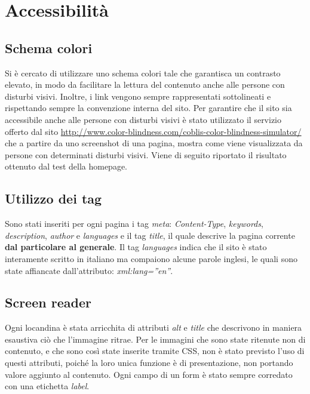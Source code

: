 \section{Accessibilità}
	\subsection{Schema colori}
	Si è cercato di utilizzare uno schema colori tale che garantisca un contrasto elevato, in modo da facilitare la lettura del contenuto anche alle persone con disturbi visivi. Inoltre, i link vengono sempre rappresentati sottolineati e rispettando sempre la convenzione interna del sito. Per garantire che il sito sia accessibile anche alle persone con disturbi visivi è stato utilizzato il servizio offerto dal sito \url{http://www.color-blindness.com/coblis-color-blindness-simulator/} che a partire da uno screenshot di una pagina, mostra come viene visualizzata da persone con determinati disturbi visivi. Viene di seguito riportato il risultato ottenuto dal test della homepage.

	\subsection{Utilizzo dei tag}
	Sono stati inseriti per ogni pagina i tag \textit{meta}: \textit{Content-Type}, \textit{keywords}, \textit{description}, \textit{author} e \textit{languages} e il tag \textit{title}, il quale descrive la pagina corrente \textbf{dal particolare al generale}. Il tag \textit{languages} indica che il sito è stato interamente scritto in italiano ma compaiono alcune parole inglesi, le quali sono state affiancate dall’attributo: \textit{xml:lang=”en”}.
	
	\subsection{Screen reader}
	Ogni locandina è stata arricchita di attributi \textit{alt} e \textit{title} che descrivono in maniera esaustiva ciò che l'immagine ritrae. Per le immagini che sono state ritenute non di contenuto, e che sono così state inserite tramite CSS, non è stato previsto l'uso di questi attributi, poiché la loro unica funzione è di presentazione, non portando valore aggiunto al contenuto.
	Ogni campo di un form è stato sempre corredato con una etichetta \textit{label}.
	
